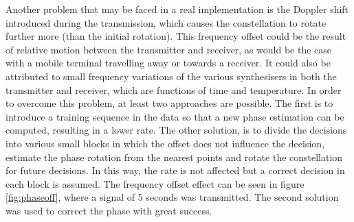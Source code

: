 \documentclass[12pt,a4paper,openright]{article}
\begin{document}
Another problem that may be faced in a real implementation is the Doppler shift introduced during the transmission, which causes the constellation to rotate further more (than the initial rotation). This frequency offset could be the result of relative motion between the transmitter and receiver, as would be the case with a mobile terminal travelling away or towards a receiver. It could also be attributed to small frequency variations of the various synthesisers in both the transmitter and receiver, which are functions of time and temperature. In order to overcome this problem, at least two approaches are possible. The first is to introduce a training sequence in the data so that a new phase estimation can be computed, resulting in a lower rate. The other solution, is to divide the decisions into various small blocks in which the offset does not influence the decision, estimate the phase rotation from the nearest points and rotate the constellation for future decisions. In this way, the rate is not affected but a correct decision in each block is assumed. The frequency offset effect can be seen in figure \ref{fig:phaseoff}, where a signal of 5 seconds was transmitted. The second solution was used to correct the phase with great success.
\end{document}
